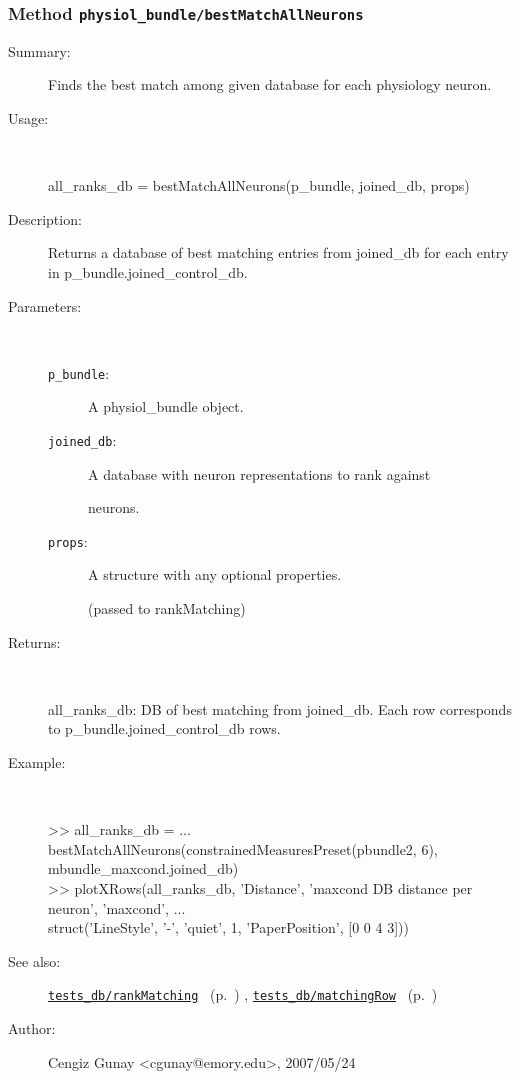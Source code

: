 \subsubsection[Method \texttt{bestMatchAllNeurons}]{Method \texttt{physiol\_bundle/bestMatchAllNeurons}}%
%
\label{ref_physiol_bundle__bestMatchAllNeurons}%
\hypertarget{ref_physiol_bundle__bestMatchAllNeurons}{}%
\begin{description}
\item[Summary:]Finds the best match among given database for each physiology neuron.
%
\item[Usage:]~%
\begin{lyxcode}%
all\_ranks\_db = bestMatchAllNeurons(p\_bundle, joined\_db, props)
%
\end{lyxcode}%
%
\item[Description:]%
Returns a database of best matching entries from joined\_db for each
 entry in p\_bundle.joined\_control\_db.
\item[Parameters:]~
\begin{description}%
\item[\texttt{p\_bundle}:]
 A physiol\_bundle object.
\item[\texttt{joined\_db}:]
 A database with neuron representations to rank against

neurons.\item[\texttt{props}:]
 A structure with any optional properties.

(passed to rankMatching)\end{description}%
%
\item[Returns:]~

	all\_ranks\_db: DB of best matching from joined\_db. Each row
		corresponds to p\_bundle.joined\_control\_db rows.
%
\item[Example:]~
\begin{lyxcode} >> all\_ranks\_db = ...\\%
        bestMatchAllNeurons(constrainedMeasuresPreset(pbundle2, 6), mbundle\_maxcond.joined\_db)\\%
 >> plotXRows(all\_ranks\_db, 'Distance', 'maxcond DB distance per neuron', 'maxcond', ...\\%
              struct('LineStyle', '-', 'quiet', 1, 'PaperPosition', [0 0 4 3]))\\%
\end{lyxcode}
%
\item[See also:]%
\hyperlink{ref_tests_db__rankMatching}{\texttt{tests\_db/rankMatching}}%
\ (p.~\pageref{ref_tests_db__rankMatching})%
%
, \hyperlink{ref_tests_db__matchingRow}{\texttt{tests\_db/matchingRow}}%
\ (p.~\pageref{ref_tests_db__matchingRow})%
%
%
\item[Author:]%
Cengiz Gunay <cgunay@emory.edu>, 2007/05/24%
\end{description}
\methodline%
